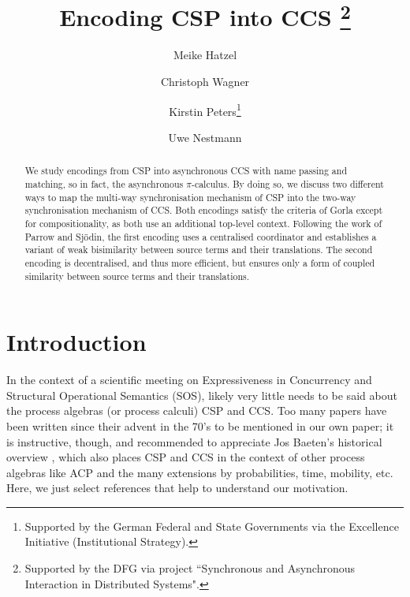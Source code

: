 \documentclass[copyright,creativecommons]{eptcs}
\title{Encoding CSP into CCS
	\thanks{Supported by the DFG via project ``Synchronous and Asynchronous Interaction in Distributed Systems".}}
\author{Meike Hatzel 
	\institute{TU Berlin}
	\and Christoph Wagner
	\institute{TU Berlin}
	\and Kirstin Peters\thanks{Supported by the German Federal and State Governments via the Excellence Initiative (Institutional Strategy).}
	\institute{TU Dresden}
	\and Uwe Nestmann
	\institute{TU Berlin}
}
\begin{document}
\maketitle

\begin{abstract}
	We study encodings from CSP into asynchronous CCS with name passing and matching, so in fact, the asynchronous $\pi$-calculus. By doing so, we discuss two different ways to map the multi-way synchronisation mechanism of CSP into the two-way synchronisation mechanism of CCS. Both encodings satisfy the criteria of Gorla except for compositionality, as both use an additional top-level context. Following the work of Parrow and Sjödin, the first encoding uses a centralised coordinator and establishes a variant of weak bisimilarity between source terms and their translations. The second encoding is decentralised, and thus more efficient, but ensures only a form of coupled similarity between source terms and their translations.
\end{abstract}


\section{Introduction}

In the context of a scientific meeting on Expressiveness in Concurrency and Structural Operational Semantics (SOS), likely very little needs to be said about the process algebras (or process calculi) CSP and CCS. Too many papers have been written since their advent in the 70's to be mentioned in our own paper; it is instructive, though, and recommended to appreciate Jos Baeten's historical overview \cite{Baeten:2005:BHP:1085667.1085669}, which also places CSP and CCS in the context of other process algebras like ACP and the many extensions by probabilities, time, mobility, etc. Here, we just select references that help to understand our motivation.
\end{document}
